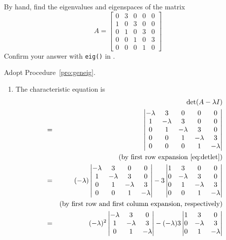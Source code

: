 \begin{example} \label{eg:fiveev}
By hand, find the eigenvalues and eigenspaces of the matrix
\begin{equation*}
A=\begin{bmatrix}0&3&0&0&0
\\1&0&3&0&0
\\0&1&0&3&0
\\0&0&1&0&3
\\0&0&0&1&0\end{bmatrix}
\end{equation*}
Confirm your answer with \verb|eig()| in \script.
\begin{solution} 
Adopt Procedure~\ref{pro:geneig}.
\begin{enumerate}
\item The characteristic equation is
\begin{eqnarray*}
&&\det(A-\lambda I)
\\&=&\begin{vmatrix}-\lambda&3&0&0&0
\\1&-\lambda&3&0&0
\\0&1&-\lambda&3&0
\\0&0&1&-\lambda&3
\\0&0&0&1&-\lambda\end{vmatrix}
\\&&(\text{by first row expansion~\eqref{eq:detlet}})
\\&=&(-\lambda)\begin{vmatrix}-\lambda&3&0&0
\\1&-\lambda&3&0
\\0&1&-\lambda&3
\\0&0&1&-\lambda\end{vmatrix}
-3\begin{vmatrix}1&3&0&0
\\0&-\lambda&3&0
\\0&1&-\lambda&3
\\0&0&1&-\lambda\end{vmatrix}
\\&&(\text{by first row and first column expansion, respectively})
\\&=&(-\lambda)^2\begin{vmatrix}-\lambda&3&0
\\1&-\lambda&3
\\0&1&-\lambda\end{vmatrix}
-(-\lambda)3\begin{vmatrix}1&3&0
\\0&-\lambda&3
\\0&1&-\lambda\end{vmatrix}

\end{eqnarray*}
\end{enumerate}
\end{solution}
\end{example}
